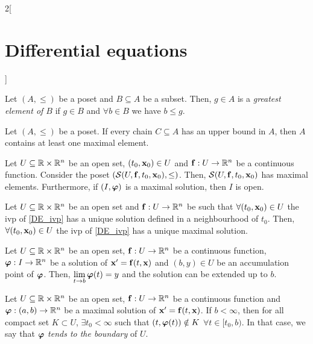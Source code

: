 \documentclass[../../../main.tex]{subfiles}
\begin{document}
\begin{multicols}{2}[\section{Differential equations}]
\begin{definition}
    \end{definition}
    \begin{definition}
        Let $(A,\leq )$ be a poset and $B\subseteq A$ be a subset. Then, $g\in A$ is a \textit{greatest element of $B$} if $g\in B$ and $\forall b\in B$ we have $b \leq  g$.
    \end{definition}
    \begin{lemma}
        Let $(A,\leq )$ be a poset. If every chain $C\subseteq A$ has an upper bound in $A$, then $A$ contains at least one maximal element.
    \end{lemma}
    \begin{theorem}
        Let $U\subseteq\mathbb{R}\times\mathbb{R}^n$ be an open set, $(t_0,\boldsymbol{\mathrm{x}}_0)\in U$ and $\boldsymbol{\mathrm{f}}:U\rightarrow\mathbb{R}^n$ be a continuous function. Consider the poset $(\mathcal{S}(U,\boldsymbol{\mathrm{f}},t_0,\boldsymbol{\mathrm{x}}_0),\leq)$. Then, $\mathcal{S}(U,\boldsymbol{\mathrm{f}},t_0,\boldsymbol{\mathrm{x}}_0)$ has maximal elements. Furthermore, if $(I,\boldsymbol{\mathrm{\varphi}})$ is a maximal solution, then $I$ is open.
    \end{theorem}
    \begin{prop}
        Let $U\subseteq\mathbb{R}\times\mathbb{R}^n$ be an open set and $\boldsymbol{\mathrm{f}}:U\rightarrow\mathbb{R}^n$ be such that $\forall(t_0,\boldsymbol{\mathrm{x}}_0)\in U$ the ivp of \cref{DE_ivp} has a unique solution defined in a neighbourhood of $t_0$. Then, $\forall(t_0,\boldsymbol{\mathrm{x}}_0)\in U$ the ivp of \cref{DE_ivp} has a unique maximal solution.
    \end{prop}
    \begin{lemma}
        Let $U\subseteq\mathbb{R}\times\mathbb{R}^n$ be an open set, $\boldsymbol{\mathrm{f}}:U\rightarrow\mathbb{R}^n$ be a continuous function, $\boldsymbol{\mathrm{\varphi}}:I\rightarrow\mathbb{R}^n$ be a solution of $\boldsymbol{\mathrm{x}}'=\boldsymbol{\mathrm{f}}(t,\boldsymbol{\mathrm{x}})$ and $(b,y)\in U$ be an accumulation point of $\boldsymbol{\mathrm{\varphi}}$. Then, $\displaystyle\lim_{t\to b}\boldsymbol{\mathrm{\varphi}}(t)=y$ and the solution can be extended up to $b$.
    \end{lemma}
    \begin{corollary}
        Let $U\subseteq\mathbb{R}\times\mathbb{R}^n$ be an open set, $\boldsymbol{\mathrm{f}}:U\rightarrow\mathbb{R}^n$ be a continuous function and $\boldsymbol{\mathrm{\varphi}}:(a,b)\rightarrow\mathbb{R}^n$ be a maximal solution of $\boldsymbol{\mathrm{x}}'=\boldsymbol{\mathrm{f}}(t,\boldsymbol{\mathrm{x}})$. If $b<\infty$, then for all compact set $K\subset U$, $\exists t_0<\infty$ such that $(t,\boldsymbol{\mathrm{\varphi}}(t))\notin K$ $\forall t\in[t_0,b)$. In that case, we say that $\boldsymbol{\mathrm{\varphi}}$ \textit{tends to the boundary} of $U$.
    \end{corollary}

\end{multicols}
\end{document}

